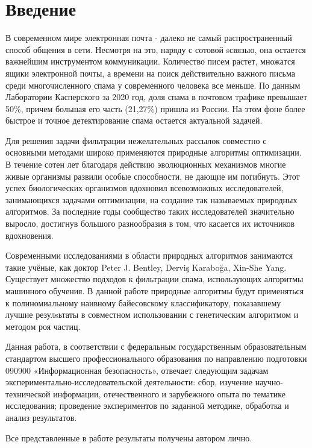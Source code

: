 \chapter*{Введение}
В современном мире электронная почта - далеко не самый
распространенный способ общения в сети. Несмотря на это,
наряду с сотовой sсвязью, она остается важнейшим инструментом коммуникации.
Количество писем растет, множатся ящики электронной почты, а времени на поиск действительно важного письма
среди многочисленного спама у современного человека все меньше. По данным Лаборатории Касперского за 2020
год, доля спама в почтовом трафике превышает 50\%, причем большая его часть (21,27\%) пришла из России. \cite{stat}
На этом фоне более быстрое и точное детектирование спама остается актуальной задачей.

Для решения задачи фильтрации нежелательных рассылок совместно с основными методами широко применяются
природные алгоритмы оптимизации. В течение сотен лет благодаря действию эволюционных механизмов многие
живые организмы развили особые способности, не дающие им погибнуть. Этот успех биологических организмов
вдохновил всевозможных исследователей,  занимающихся задачами оптимизации, на создание так называемых
природных алгоритмов. За последние годы сообщество таких исследователей значительно выросло, достигнув
большого разнообразия в том, что касается их источников вдохновения. \cite{BioInspiredTaxonomy}

Современными исследованиями в области природных алгоритмов занимаются такие учёные, как доктор Peter J. Bentley,
Derviş Karaboğa, Xin-She Yang. Существует множество подходов к фильтрации спама, использующих алгоритмы машинного
обучения. В данной работе природные алгоритмы будут применяться к полиномиальному наивному байесовскому классификатору,
показавшему лучшие резулsьтаты в совместном использовании с генетическим алгоритмом и методом роя частиц. \cite{IEEE}

Данная работа, в соответствии с федеральным государственным образовательным стандартом высшего профессионального
образования по направлению подготовки 090900 «Информационная безопасность», отвечает следующим задачам
экспериментально-исследовательской деятельности: сбор, изучение научно-технической информации, отечественного и
зарубежного опыта по тематике исследования; проведение экспериментов по заданной методике, обработка и анализ результатов.

Все представленные в работе результаты получены автором лично.

